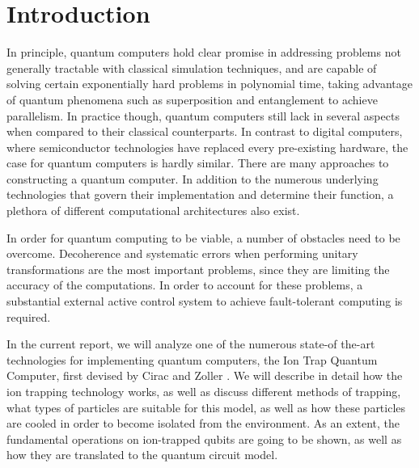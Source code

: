 \documentclass[../main.tex]{subfiles}
\begin{document}
\chapter{Introduction}
\par
\tab In principle, quantum computers hold clear promise in addressing problems not generally tractable with classical simulation techniques, and are capable of solving certain exponentially hard problems in polynomial time, taking advantage of quantum phenomena such as superposition and entanglement to achieve parallelism. In practice though, quantum computers still lack in several aspects when compared to their classical counterparts. In contrast to digital computers, where semiconductor technologies have replaced every pre-existing hardware, the case for quantum computers is hardly similar. There are many approaches to constructing a quantum computer. In addition to the numerous underlying technologies that govern their implementation and determine their function, a plethora of different computational architectures also exist. 
\par
In order for quantum computing to be viable, a number of obstacles need to be overcome. Decoherence and systematic errors when performing unitary transformations are the most important problems, since they are limiting the accuracy of the computations. In order to account for these problems, a substantial external active control system to achieve fault-tolerant computing is required. 
\par
In the current report, we will analyze one of the numerous state-of the-art technologies for implementing quantum computers, the Ion Trap Quantum Computer, first devised by Cirac and Zoller \cite{PhysRevLett.74.4091}. We will describe in detail how the ion trapping technology works, as well as discuss different methods of trapping, what types of particles are suitable for this model, as well as how these particles are cooled in order to become isolated from the environment. As an extent, the fundamental operations on ion-trapped qubits are going to be shown, as well as how they are translated to the quantum circuit model. \\
\end{document}
